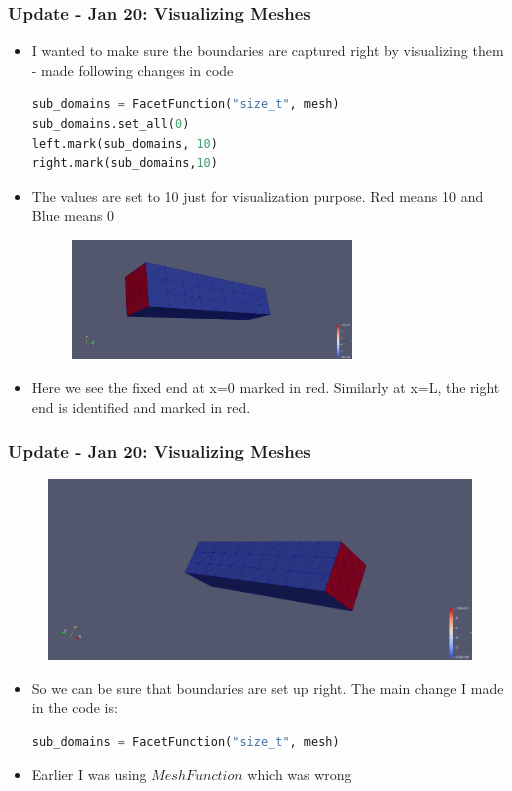 \documentclass{beamer}
\begin{document}
 \begin{frame}[fragile]
\frametitle{Update - Jan 20: Visualizing Meshes}
\begin{itemize}
		\vfill
		\item{I wanted to make sure the boundaries are captured right by visualizing them - made following changes in code}
	\begin{lstlisting}[language=Python, basicstyle=\ttfamily\small,  keywordstyle=\color{blue}]
sub_domains = FacetFunction("size_t", mesh)
sub_domains.set_all(0)	
left.mark(sub_domains, 10)
right.mark(sub_domains,10)

\end{lstlisting}
\vfill
\item{The values are set to 10 just for visualization purpose. Red means 10 and Blue means 0}

\begin{figure}
\includegraphics[width=0.7\textwidth]{Fixed_End}
\end{figure}
\vfill
\item{Here we see the fixed end at x=0 marked in red. Similarly at x=L, the right end is identified and marked in red.}

\end{itemize}
\end{frame}

 \begin{frame}[fragile]
 \frametitle{Update - Jan 20: Visualizing Meshes}
\begin{figure}
\includegraphics[width=.9\textwidth]{Right_End}
\end{figure}
\begin{itemize}
\vfill
		\item{So we can be sure that boundaries are set up right. The main change I made in the code is:}
				\begin{lstlisting}[language=Python, basicstyle=\ttfamily\small,  keywordstyle=\color{blue}]
sub_domains = FacetFunction("size_t", mesh) 
\end{lstlisting}
\vfill
		\item{Earlier I was using $MeshFunction$ which was wrong}	
\end{itemize}
\end{frame}
\end{document}
